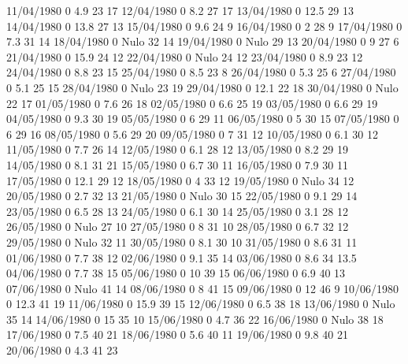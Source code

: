 11/04/1980  0      4.9    23     17 
12/04/1980  0      8.2    27     17 
13/04/1980  0      12.5   29     13 
14/04/1980  0      13.8   27     13 
15/04/1980  0      9.6    24     9 
16/04/1980  0      2      28     9 
17/04/1980  0      7.3    31     14 
18/04/1980  0     Nulo    32     14 
19/04/1980  0     Nulo    29     13 
20/04/1980  0      9      27     6 
21/04/1980  0      15.9   24     12 
22/04/1980  0     Nulo    24     12 
23/04/1980  0      8.9    23     12 
24/04/1980  0      8.8    23     15 
25/04/1980  0      8.5    23     8 
26/04/1980  0      5.3    25     6 
27/04/1980  0      5.1    25     15 
28/04/1980  0     Nulo    23     19 
29/04/1980  0      12.1   22     18 
30/04/1980  0     Nulo    22     17 
01/05/1980  0      7.6    26     18 
02/05/1980  0      6.6    25     19 
03/05/1980  0      6.6    29     19 
04/05/1980  0      9.3    30     19 
05/05/1980  0      6      29     11 
06/05/1980  0      5      30     15 
07/05/1980  0      6      29     16 
08/05/1980  0      5.6    29     20 
09/05/1980  0      7      31     12 
10/05/1980  0      6.1    30     12 
11/05/1980  0      7.7    26     14 
12/05/1980  0      6.1    28     12 
13/05/1980  0      8.2    29     19 
14/05/1980  0      8.1    31     21 
15/05/1980  0      6.7    30     11 
16/05/1980  0      7.9    30     11 
17/05/1980  0      12.1   29     12 
18/05/1980  0      4      33     12 
19/05/1980  0     Nulo    34     12 
20/05/1980  0      2.7    32     13 
21/05/1980  0     Nulo    30     15 
22/05/1980  0      9.1    29     14 
23/05/1980  0      6.5    28     13 
24/05/1980  0      6.1    30     14 
25/05/1980  0      3.1    28     12 
26/05/1980  0     Nulo    27     10 
27/05/1980  0      8      31     10 
28/05/1980  0      6.7    32     12 
29/05/1980  0     Nulo    32     11 
30/05/1980  0      8.1    30     10 
31/05/1980  0      8.6    31     11 
01/06/1980  0      7.7    38     12 
02/06/1980  0      9.1    35     14 
03/06/1980  0      8.6    34     13.5 
04/06/1980  0      7.7    38     15 
05/06/1980  0      10     39     15 
06/06/1980  0      6.9    40     13 
07/06/1980  0     Nulo    41     14 
08/06/1980  0      8      41     15 
09/06/1980  0      12     46     9 
10/06/1980  0      12.3   41     19 
11/06/1980  0      15.9   39     15 
12/06/1980  0      6.5    38     18 
13/06/1980  0     Nulo    35     14 
14/06/1980  0      15     35     10 
15/06/1980  0      4.7    36     22 
16/06/1980  0     Nulo    38     18 
17/06/1980  0      7.5    40     21 
18/06/1980  0      5.6    40     11 
19/06/1980  0      9.8    40     21 
20/06/1980  0      4.3    41     23 
